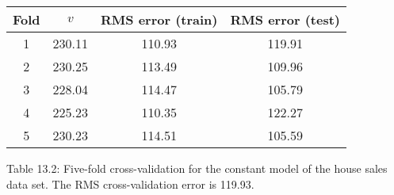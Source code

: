 \begin{table}
\begin{tabular}{c c c c} \hline \hline Fold & \(v\) & RMS error (train) & RMS error (test) \\ \hline
1 & 230.11 & 110.93 & 119.91 \\
2 & 230.25 & 113.49 & 109.96 \\
3 & 228.04 & 114.47 & 105.79 \\
4 & 225.23 & 110.35 & 122.27 \\
5 & 230.23 & 114.51 & 105.59 \\ \hline \hline \end{tabular}
\end{table}
Table 13.2: Five-fold cross-validation for the constant model of the house sales data set. The RMS cross-validation error is 119.93.

 